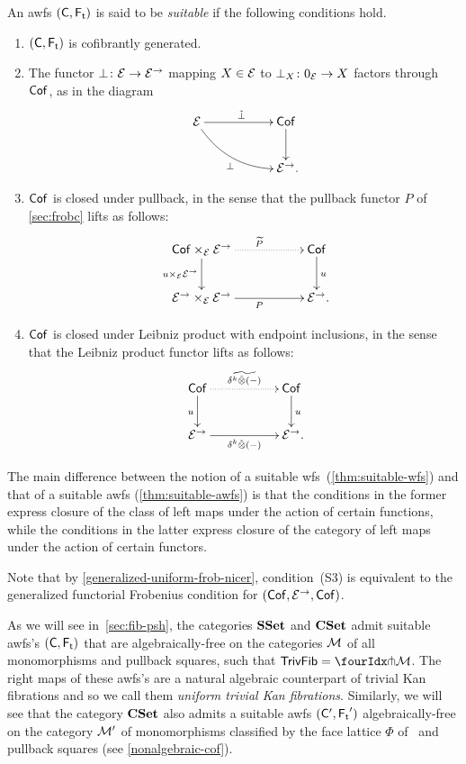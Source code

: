 \documentclass[reqno,10pt,a4paper,oneside,draft]{amsart}
\begin{document}
{{\begin{definition} \label{thm:suitable-awfs}
An awfs $(\CC, \TF)$ is said to be \emph{suitable} if the following conditions hold.
\begin{enumerate}[({S}1)]
\item $(\CC, \TF)$ is cofibrantly generated.
\item The functor $\bot \co \cal{E} \to \cal{E}^\to$ mapping $X \in \cal{E}$ to $\bot_X \co 0_{\cal{E}} \to X$ factors through $\Cof$, as in the diagram
\[
\xymatrix@C+3em{
\catE \ar[r]^{\tilde{\bot}} \ar@/_1pc/[dr]_{\bot} & \Cof \ar[d] \\
  & \catE^\to \rlap{.} }
\]
\item $\Cof$ is closed under pullback, in the sense that the pullback functor $P$ of \cref{sec:frobc} lifts as follows:
\[
\xymatrix@C+3em{
  \Cof \times_{\cal{E}} \cal{E}^\to
  \ar@{.>}[r]^{\widetilde{P}}
  \ar[d]_{u \times_{\cal{E}} \cal{E}^\to}
&
  \Cof 
  \ar[d]^{u}
\\
  \catE^\to \times_{\cal{E}} \calE^\to
  \ar[r]_{P}
&
  \catE^\to
\rlap{.}}
\]
\item $\Cof$ is closed under Leibniz product with endpoint inclusions, in the sense that the Leibniz product functor lifts as follows:
\[
\xymatrix@C+3em{
  \Cof
  \ar@{.>}[r]^{\widetilde{\kcyl \hatotimes (-)}}
  \ar[d]_{u}
&
 \Cof
  \ar[d]^{u}
\\
  \catE^\to
  \ar[r]_{\kcyl \hatotimes (-)}
&
  \catE^\to
\rlap{.}}
\]
\end{enumerate}
\end{definition}

The main difference between the notion of a suitable wfs~(\cref{thm:suitable-wfs}) and that of a suitable awfs (\cref{thm:suitable-awfs}) is that the conditions in the former express closure of the class of left maps under the action of certain functions, while the conditions in the latter express closure of the category of left maps under the action of certain functors.

Note that by \cref{generalized-uniform-frob-nicer}, condition~(S3) is equivalent to the generalized functorial Frobenius condition for $(\Cof, \cal{E}^\to, \Cof)$.

\begin{example} \label{unif-triv-fib-sset}
As we will see in~\cref{sec:fib-psh}, the categories $\SSet$ and $\CSet$ admit suitable awfs's $(\CC, \TF)$ that are algebraically-free on the categories $\cal{M}$ of all monomorphisms and pullback squares, \ie such that $\TrivFib = \liftr{\cal{M}}$.
The right maps of these awfs's are a natural algebraic counterpart of trivial Kan fibrations and so we call them \emph{uniform trivial Kan fibrations}.
Similarly, we will see that the category $\CSet$ also admits a suitable awfs $(\CC', \TF')$ algebraically-free on the category $\cal{M}'$ of monomorphisms classified by the face lattice $\Phi$ of~\cite{cohen-et-al:cubicaltt} and pullback squares (see \cref{nonalgebraic-cof}).
\end{example}

}}
\end{document}
